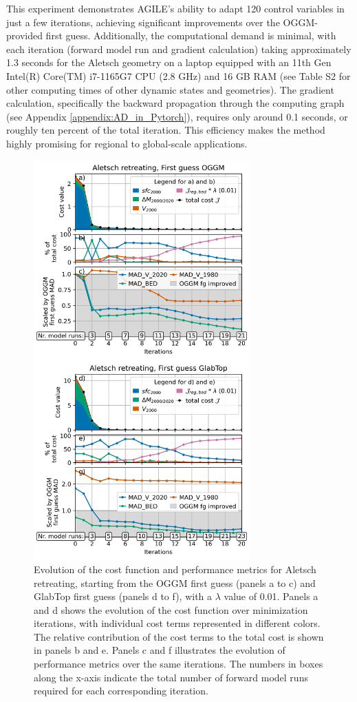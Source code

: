 \documentclass[journal abbreviation, manuscript]{copernicus}
\begin{document}
This experiment demonstrates AGILE’s ability to adapt 120 control variables in just a few iterations, achieving significant improvements over the OGGM-provided first guess. Additionally, the computational demand is minimal, with each iteration (forward model run and gradient calculation) taking approximately 1.3 seconds for the Aletsch geometry on a laptop equipped with an 11th Gen Intel(R) Core(TM) i7-1165G7 CPU (2.8 GHz) and 16 GB RAM (see Table S2 for other computing times of other dynamic states and geometries). The gradient calculation, specifically the backward propagation through the computing graph (see Appendix \ref{appendix:AD_in_Pytorch}), requires only around 0.1 seconds, or roughly ten percent of the total iteration. This efficiency makes the method highly promising for regional to global-scale applications.

\begin{figure}
    \centering
    \includegraphics[width=8.3cm]{fig04.png}
    \caption{Evolution of the cost function and performance metrics for Aletsch retreating, starting from the OGGM first guess (panels a to c) and GlabTop first guess (panels d to f), with a $\lambda$ value of 0.01. Panels a and d shows the evolution of the cost function over minimization iterations, with individual cost terms represented in different colors. The relative contribution of the cost terms to the total cost is shown in panels b and e. Panels c and f illustrates the evolution of performance metrics over the same iterations. The numbers in boxes along the x-axis indicate the total number of forward model runs required for each corresponding iteration.}
    \label{fig:aletsch_retreating_fg_oggm_and_fg_glabtop_cost_stats}
\end{figure}
\end{document}
